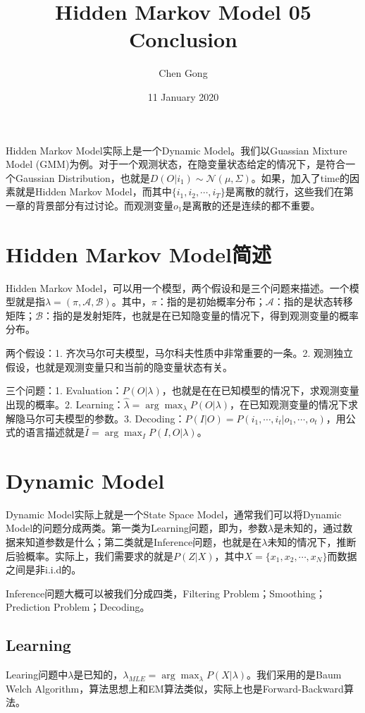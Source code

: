 \documentclass[a4paper]{article}
\title{Hidden Markov Model 05 Conclusion}
\author{Chen Gong}
\date{11 January 2020}
\begin{document}
\maketitle
Hidden Markov Model实际上是一个Dynamic Model。我们以Guassian Mixture Model (GMM)为例。对于一个观测状态，在隐变量状态给定的情况下，是符合一个Gaussian Distribution，也就是$D(O|i_1)\sim \mathcal{N}(\mu,\Sigma)$。如果，加入了time的因素就是Hidden Markov Model，而其中$\{ i_1,i_2,\cdots,i_T \}$是离散的就行，这些我们在第一章的背景部分有过讨论。而观测变量$o_1$是离散的还是连续的都不重要。

\section{Hidden Markov Model简述}
Hidden Markov Model，可以用一个模型，两个假设和是三个问题来描述。一个模型就是指$\lambda = (\pi, \mathcal{A}, \mathcal{B})$。其中，$\pi$：指的是初始概率分布；$\mathcal{A}$：指的是状态转移矩阵；$\mathcal{B}$：指的是发射矩阵，也就是在已知隐变量的情况下，得到观测变量的概率分布。

两个假设：1. 齐次马尔可夫模型，马尔科夫性质中非常重要的一条。2. 观测独立假设，也就是观测变量只和当前的隐变量状态有关。

三个问题：1. Evaluation：$P(O|\lambda)$，也就是在在已知模型的情况下，求观测变量出现的概率。2. Learning：$\hat{\lambda} = \arg\max_{\lambda}P(O|\lambda)$，在已知观测变量的情况下求解隐马尔可夫模型的参数。3. Decoding：$P(I|O) = P(i_1,\cdots,i_t|o_1,\cdots,o_t)$，用公式的语言描述就是$\hat{I} = \arg\max_I P(I,O|\lambda)$。

\section{Dynamic Model}
Dynamic Model实际上就是一个State Space Model，通常我们可以将Dynamic Model的问题分成两类。第一类为Learning问题，即为，参数$\lambda$是未知的，通过数据来知道参数是什么；第二类就是Inference问题，也就是在$\lambda$未知的情况下，推断后验概率。实际上，我们需要求的就是$P(Z|X)$，其中$X=\{ x_1,x_2,\cdots,x_N \}$而数据之间是非i.i.d的。

Inference问题大概可以被我们分成四类，Filtering Problem；Smoothing；Prediction Problem；Decoding。

\subsection{Learning}
Learing问题中$\lambda$是已知的，$\lambda_{MLE} = \arg\max_{\lambda}P(X|\lambda)$。我们采用的是Baum Welch Algorithm，算法思想上和EM算法类似，实际上也是Forward-Backward算法。
\end{document}
